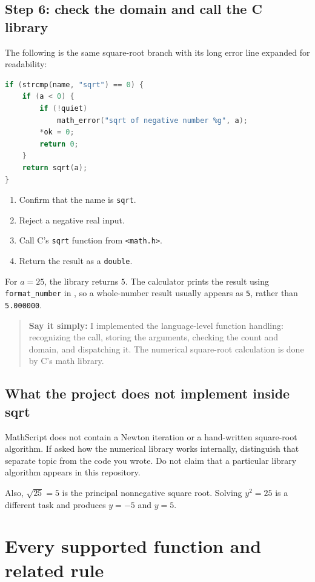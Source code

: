 \documentclass[11pt,a4paper]{report}
\newcommand{\file}[1]{\texttt{\detokenize{#1}}}
\newcommand{\say}[1]{\begin{quote}\textbf{Say it simply:} #1\end{quote}}
\begin{document}
\section{Step 6: check the domain and call the C library}
The following is the same square-root branch with its long error line
expanded for readability:
\begin{lstlisting}[language=C]
if (strcmp(name, "sqrt") == 0) {
    if (a < 0) {
        if (!quiet)
            math_error("sqrt of negative number %g", a);
        *ok = 0;
        return 0;
    }
    return sqrt(a);
}
\end{lstlisting}
\begin{enumerate}
\item Confirm that the name is \texttt{sqrt}.
\item Reject a negative real input.
\item Call C's \texttt{sqrt} function from \texttt{<math.h>}.
\item Return the result as a \texttt{double}.
\end{enumerate}
For $a=25$, the library returns $5$. The calculator prints the result using
\texttt{format\_number} in \file{src/util.c}, so a whole-number result usually
appears as \texttt{5}, rather than \texttt{5.000000}.

\say{I implemented the language-level function handling: recognizing the
call, storing the arguments, checking the count and domain, and dispatching
it. The numerical square-root calculation is done by C's math library.}

\section{What the project does not implement inside sqrt}
MathScript does not contain a Newton iteration or a hand-written square-root
algorithm. If asked how the numerical library works internally, distinguish
that separate topic from the code you wrote. Do not claim that a particular
library algorithm appears in this repository.

Also, $\sqrt{25}=5$ is the principal nonnegative square root. Solving
$y^2=25$ is a different task and produces $y=-5$ and $y=5$.

\chapter{Every supported function and related rule}
\end{document}
